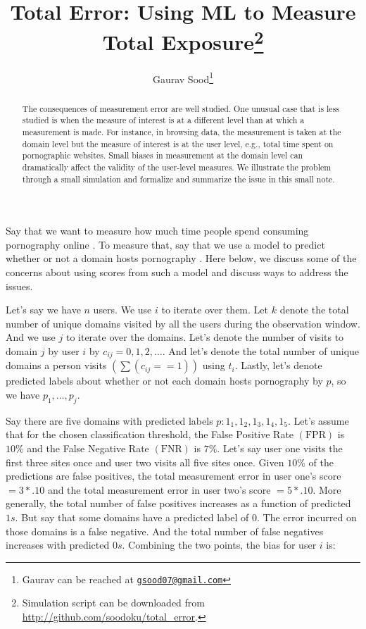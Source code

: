 \documentclass[12pt, letterpaper]{article}
\title{Total Error: Using ML to Measure Total Exposure\footnote{Simulation script can be downloaded from \url{http://github.com/soodoku/total_error}.}}
\author{Gaurav Sood\thanks{Gaurav can be reached at \href{mailto:gsood07@gmail.com}\texttt{gsood07@gmail.com}}}
\date{}
\begin{document}
\maketitle

\begin{abstract}
The consequences of measurement error are well studied. One unusual case that is less studied is when the measure of interest is at a different level than at which a measurement is made. For instance, in browsing data, the measurement is taken at the domain level but the measure of interest is at the user level, e.g., total time spent on pornographic websites. Small biases in measurement at the domain level can dramatically affect the validity of the user-level measures. We illustrate the problem through a small simulation and formalize and summarize the issue in this small note.
\end{abstract}
\doublespacing
\clearpage
{}

Say that we want to measure how much time people spend consuming pornography online \citep[e.g.,][]{shen2023holier}. To measure that, say that we use a model to predict whether or not a domain hosts pornography \citep[e.g.,][]{chintalapati2022}. Here below, we discuss some of the concerns about using scores from such a model and discuss ways to address the issues.

Let's say we have $n$ users. We use $i$ to iterate over them. Let $k$ denote the total number of unique domains visited by all the users during the observation window. And we use $j$ to iterate over the domains. Let's denote the number of visits to domain $j$ by user $i$ by $c_{i j}=0,1,2, \ldots$. And let's denote the total number of unique domains a person visits $\left(\sum\left(c_{i j}==1\right)\right)$ using $t_{i}$. Lastly, let's denote predicted labels about whether or not each domain hosts pornography by $p$, so we have $p_{1}, \ldots, p_{j}$.

Say there are five domains with predicted labels $p: 1_{1}, 1_{2}, 1_{3}, 1_{4}, 1_{5}$. Let's assume that for the chosen classification threshold, the False Positive Rate $(\mathrm{FPR})$ is $10\%$ and the False Negative Rate $(\mathrm{FNR})$ is $7\%$. Let's say user one visits the first three sites once and user two visits all five sites once. Given $10\%$ of the predictions are false positives, the total measurement error in user one's score $=3*.10$ and the total measurement error in user two's score $=5 *.10$. More generally, the total number of false positives increases as a function of predicted $1s$. But say that some domains have a predicted label of 0. The error incurred on those domains is a false negative. And the total number of false negatives increases with predicted $0s$. Combining the two points, the bias for user $i$ is:
\end{document}

